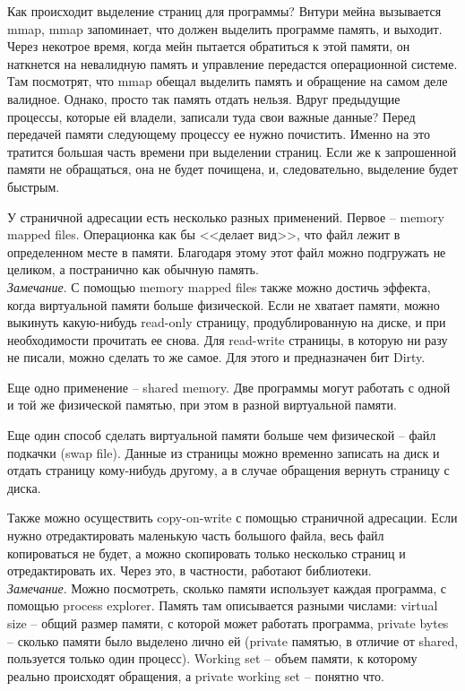 \documentclass[12pt, a4paper]{article}
\begin{document}
	\par Как происходит выделение страниц для программы? Внтури мейна вызывается mmap, mmap запоминает, что должен выделить программе память, и выходит. Через некотрое время, когда мейн пытается обратиться к этой памяти, он наткнется на невалидную память и управление передастся операционной системе. Там посмотрят, что mmap обещал выделить память и обращение на самом деле валидное. Однако, просто так память отдать нельзя. Вдруг предыдущие процессы, которые ей владели, записали туда свои важные данные? Перед передачей памяти следующему процессу ее нужно почистить. Именно на это тратится большая часть времени при выделении страниц. Если же к запрошенной памяти не обращаться, она не будет почищена, и, следовательно, выделение будет быстрым.
	\\\par У страничной адресации есть несколько разных применений. Первое -- memory mapped files. Операционка как бы <<делает вид>>, что файл лежит в определенном месте в памяти. Благодаря этому этот файл можно подгружать не целиком, а постранично как обычную память.\\
	\textit{Замечание}. С помощью memory mapped files также можно достичь эффекта, когда виртуальной памяти больше физической. Если не хватает памяти, можно выкинуть какую-нибудь read-only страницу, продублированную на диске, и при необходимости прочитать ее снова. Для read-write страницы, в которую ни разу не писали, можно сделать то же самое. Для этого и предназначен бит Dirty.
	\par Еще одно применение -- shared memory. Две программы могут работать с одной и той же физической памятью, при этом в разной виртуальной памяти.
	\par Еще один способ сделать виртуальной памяти больше чем физической -- файл подкачки (swap file). Данные из страницы можно временно записать на диск и отдать страницу кому-нибудь другому, а в случае обращения вернуть страницу с диска.
	\par Также можно осуществить copy-on-write с помощью страничной адресации. Если нужно отредактировать маленькую часть большого файла, весь файл копироваться не будет, а можно скопировать только несколько страниц и отредактировать их. Через это, в частности, работают библиотеки.
	\\\textit{Замечание}. Можно посмотреть, сколько памяти использует каждая программа, с помощью process explorer. Память там описывается разными числами: virtual size -- общий размер памяти, с которой может работать программа, private bytes -- сколько памяти было выделено лично ей (private памятью, в отличие от shared, пользуется только один процесс). Working set -- объем памяти, к которому реально происходят обращения, а private working set -- понятно что.
\end{document}
